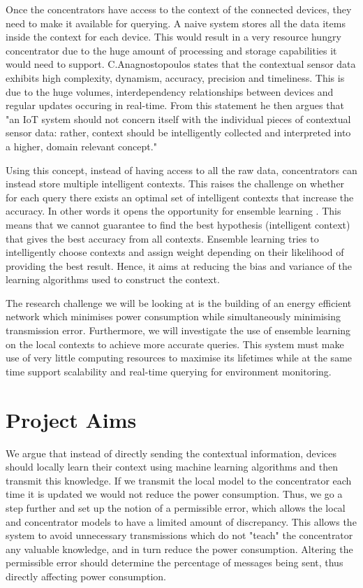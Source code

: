 \documentclass{mproj}
\begin{document}
Once the concentrators have access to the context of the connected devices, they need to make it available for querying. A naive system stores all the data items inside the context for each device. This would result in a very resource hungry concentrator due to the huge amount of processing and storage capabilities it would need to support. C.Anagnostopoulos \cite{intelligentContextualInformation} states that the contextual sensor data exhibits high complexity, dynamism, accuracy, precision and timeliness. This is due to the huge volumes, interdependency relationships between devices and regular updates occuring in real-time. From this statement he then argues that "an IoT system should not concern itself with the individual pieces of contextual sensor data: rather, context should be intelligently collected and interpreted into a higher, domain relevant concept." \cite{intelligentContextualInformation}

Using this concept, instead of having access to all the raw data, concentrators can instead store multiple intelligent contexts. This raises the challenge on whether for each query there exists an optimal set of intelligent contexts that increase the accuracy. In other words it opens the opportunity for ensemble learning \cite{dietterich2002ensemble}. This means that we cannot guarantee to find the best hypothesis (intelligent context) that gives the best accuracy from all contexts. Ensemble learning tries to intelligently choose contexts and assign weight depending on their likelihood of providing the best result. Hence, it aims at reducing the bias and variance of the learning algorithms used to construct the context. \cite{dietterich2002ensemble}

The research challenge we will be looking at is the building of an energy efficient network which minimises power consumption while simultaneously minimising transmission error. Furthermore, we will investigate the use of ensemble learning on the local contexts to achieve more accurate queries. This system must make use of very little computing resources to maximise its lifetimes while at the same time support scalability and real-time querying for environment monitoring.

\section{Project Aims}
We argue that instead of directly sending the contextual information, devices should locally learn their context using machine learning algorithms and then transmit this knowledge. If we transmit the local model to the concentrator each time it is updated we would not reduce the power consumption. Thus, we go a step further and set up the notion of a  permissible error, which allows the local and concentrator models to have a limited amount of discrepancy. This allows the system to avoid unnecessary transmissions which do not "teach" the concentrator any valuable knowledge, and in turn reduce the power consumption. Altering the permissible error should determine the percentage of messages being sent, thus directly affecting power consumption.
\end{document}

